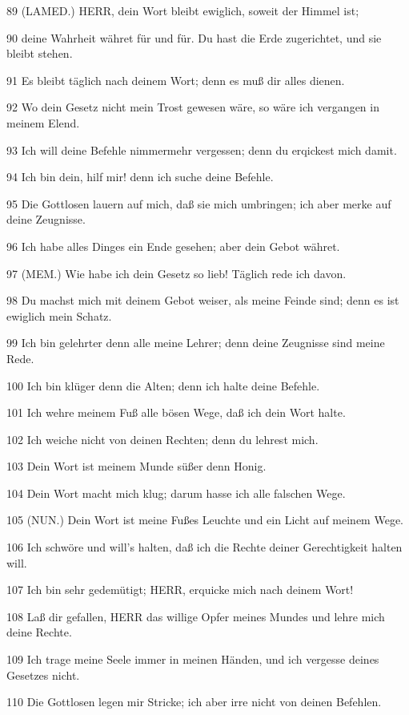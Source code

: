 \par 89 (LAMED.) HERR, dein Wort bleibt ewiglich, soweit der Himmel ist;
\par 90 deine Wahrheit währet für und für. Du hast die Erde zugerichtet, und sie bleibt stehen.
\par 91 Es bleibt täglich nach deinem Wort; denn es muß dir alles dienen.
\par 92 Wo dein Gesetz nicht mein Trost gewesen wäre, so wäre ich vergangen in meinem Elend.
\par 93 Ich will deine Befehle nimmermehr vergessen; denn du erqickest mich damit.
\par 94 Ich bin dein, hilf mir! denn ich suche deine Befehle.
\par 95 Die Gottlosen lauern auf mich, daß sie mich umbringen; ich aber merke auf deine Zeugnisse.
\par 96 Ich habe alles Dinges ein Ende gesehen; aber dein Gebot währet.
\par 97 (MEM.) Wie habe ich dein Gesetz so lieb! Täglich rede ich davon.
\par 98 Du machst mich mit deinem Gebot weiser, als meine Feinde sind; denn es ist ewiglich mein Schatz.
\par 99 Ich bin gelehrter denn alle meine Lehrer; denn deine Zeugnisse sind meine Rede.
\par 100 Ich bin klüger denn die Alten; denn ich halte deine Befehle.
\par 101 Ich wehre meinem Fuß alle bösen Wege, daß ich dein Wort halte.
\par 102 Ich weiche nicht von deinen Rechten; denn du lehrest mich.
\par 103 Dein Wort ist meinem Munde süßer denn Honig.
\par 104 Dein Wort macht mich klug; darum hasse ich alle falschen Wege.
\par 105 (NUN.) Dein Wort ist meine Fußes Leuchte und ein Licht auf meinem Wege.
\par 106 Ich schwöre und will's halten, daß ich die Rechte deiner Gerechtigkeit halten will.
\par 107 Ich bin sehr gedemütigt; HERR, erquicke mich nach deinem Wort!
\par 108 Laß dir gefallen, HERR das willige Opfer meines Mundes und lehre mich deine Rechte.
\par 109 Ich trage meine Seele immer in meinen Händen, und ich vergesse deines Gesetzes nicht.
\par 110 Die Gottlosen legen mir Stricke; ich aber irre nicht von deinen Befehlen.
